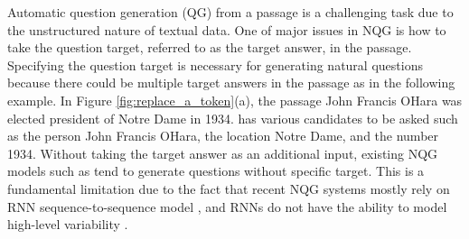 \documentclass[letterpaper]{article} %
\newcommand{\kj}[1]{\textcolor{red}{#1}}
\newcommand{\jb}[1]{\textcolor{cyan}{#1}}
\begin{document}
Automatic question generation (QG) from a passage is a challenging task due to the unstructured nature of textual data. One of major issues in NQG is how to take the question target, referred to as the target answer, in the passage. Specifying the question target is necessary for generating natural questions because there could be multiple target answers in the passage as in the following example. In Figure \ref{fig:replace_a_token}(a), the passage John Francis OHara was elected president of Notre Dame in 1934. has various candidates to be asked such as the person John Francis OHara, the location Notre Dame, and the number 1934. Without taking the target answer as an additional input, existing NQG models such as \cite{du2017learning} tend to generate questions without specific target. This is a fundamental limitation due to the fact that recent NQG systems mostly rely on RNN sequence-to-sequence model \cite{sutskever2014sequence,bahdanau2014neural}, and RNNs do not have the ability to model high-level variability \cite{serban2017hierarchical}.
%
%
%
%

\end{document}
